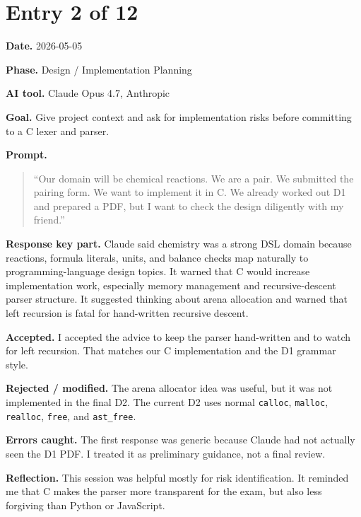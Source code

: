 \documentclass[11pt,a4paper]{article}
\newcommand{\code}[1]{\texttt{#1}}
\newcommand{\field}[2]{\textbf{#1.} #2\par}
\newcommand{\prompt}[1]{%
  \textbf{Prompt.}
  \begin{quote}\small #1\end{quote}
}
\begin{document}
\section{Entry 2 of 12}
\field{Date}{2026-05-05}
\field{Phase}{Design / Implementation Planning}
\field{AI tool}{Claude Opus 4.7, Anthropic}
\field{Goal}{Give project context and ask for implementation risks before committing to a C lexer and parser.}
\prompt{``Our domain will be chemical reactions. We are a pair. We submitted the pairing form. We want to implement it in C. We already worked out D1 and prepared a PDF, but I want to check the design diligently with my friend.''}
\field{Response key part}{Claude said chemistry was a strong DSL domain because reactions, formula literals, units, and balance checks map naturally to programming-language design topics. It warned that C would increase implementation work, especially memory management and recursive-descent parser structure. It suggested thinking about arena allocation and warned that left recursion is fatal for hand-written recursive descent.}
\field{Accepted}{I accepted the advice to keep the parser hand-written and to watch for left recursion. That matches our C implementation and the D1 grammar style.}
\field{Rejected / modified}{The arena allocator idea was useful, but it was not implemented in the final D2. The current D2 uses normal \code{calloc}, \code{malloc}, \code{realloc}, \code{free}, and \code{ast\_free}.}
\field{Errors caught}{The first response was generic because Claude had not actually seen the D1 PDF. I treated it as preliminary guidance, not a final review.}
\field{Reflection}{This session was helpful mostly for risk identification. It reminded me that C makes the parser more transparent for the exam, but also less forgiving than Python or JavaScript.}
\end{document}
